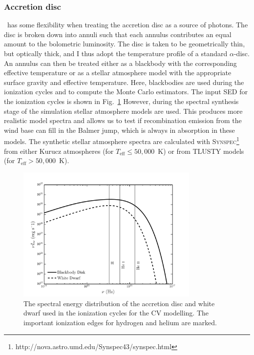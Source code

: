 \subsubsection{Accretion disc}

\py\ has some flexibility when treating the accretion 
disc as a source of photons. The disc is broken down into annuli 
such that each annulus contributes an equal amount to the bolometric
luminosity. The disc is taken to be geometrically thin, but optically
thick, and I thus adopt the temperature profile of a standard
\cite{shakurasunyaev1973} $\alpha$-disc. An annulus can then
be treated either as a blackbody with the corresponding effective
temperature or as a stellar atmosphere model with the appropriate
surface gravity and effective temperature. Here, blackbodies are used
during the ionization cycles and to compute the Monte Carlo
estimators. The input SED for the ionization cycles is shown in 
Fig.~\ref{cv_model_sed}
However, during the spectral synthesis stage of the 
simulation stellar atmosphere models are used. This produces more
realistic model spectra and allows us to test if recombination
emission from the wind base can fill in the Balmer jump, which is
always in absorption in these models. The synthetic stellar atmosphere
spectra are calculated with
\textsc{Synspec}\footnote{http://nova.astro.umd.edu/Synspec43/synspec.html}
from either Kurucz \citep{kurucz1991} atmospheres (for $T_{\mathrm{eff}} \leq
50,000$~K) or from \textsc{TLUSTY} \citep{tlusty} models (for $T_{\mathrm{eff}} > 50,000$~K). 

\begin{figure} 
\centering
\includegraphics[width=0.8\textwidth]{figures/05-cvpaper/sed.png}
\caption{The spectral energy distribution of the 
accretion disc and white dwarf used in the ionization cycles for
the CV modelling. The important ionization edges for
hydrogen and helium are marked.}
\label{cv_model_sed}
\end{figure} 

